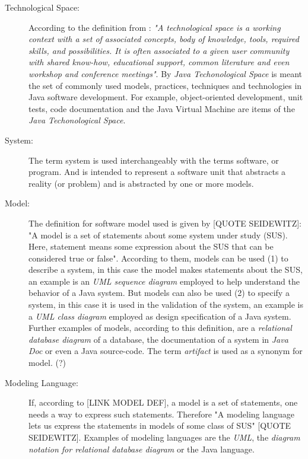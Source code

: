 \documentclass[tuberlin,cic,tc,openright,english,noabntcite]{iiufrgs}
\begin{document}
\begin{description}
\item[Technological Space:] According to the definition from \citet[p. 1]{kurtev2002technological}: \emph{"A technological space is a working context with a set of associated concepts, body of knowledge, tools, required skills, and possibilities. It is often associated to a given user community with shared know-how, educational support, common literature and even workshop and conference meetings"}. By \emph{Java Techonological Space} is meant the set of commonly used models, practices, techniques and technologies in Java software development. For example, object-oriented development, unit tests, code documentation and the Java Virtual Machine are items of the \emph{Java Techonological Space}.

\item[System:] The term system is used interchangeably with the terms software, or program. And is intended to represent a software unit that abstracts a reality (or problem) and is abstracted by one or more models.

\item[Model:] The definition for software model used is given by [QUOTE SEIDEWITZ]: "A model is a set of statements about some system under study (SUS). Here, statement means some expression about the SUS that can be considered true or false". According to them, models can be used (1) to describe a system, in this case the model makes statements about the SUS, an example is an \emph{UML sequence diagram} employed to help understand the behavior of a Java system. But models can also be used (2) to specify a system, in this case it is used in the validation of the system, an example is a \emph{UML class diagram} employed as design specification of a Java system. Further examples of models, according to this definition, are a \emph{relational database diagram} of a database, the documentation of a system in \emph{Java Doc} or even a Java source-code. The term \emph{artifact} is used as a synonym for model. (?)

\item[Modeling Language:] If, according to [LINK MODEL DEF], a model is a set of statements, one needs a way to express such statements. Therefore "A modeling language lets us express the statements in models of some class of SUS" [QUOTE SEIDEWITZ]. Examples of modeling languages are the \emph{UML}, the \emph{diagram notation for relational database diagram} or the Java language.


\end{description}
\end{document}
